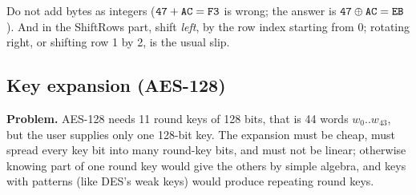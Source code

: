 \begin{trap}[: AddRoundKey]
Do not add bytes as integers ($\texttt{47} + \texttt{AC} = \texttt{F3}$ is wrong; the answer is $\texttt{47} \oplus \texttt{AC} = \texttt{EB}$). And in the ShiftRows part, shift \emph{left}, by the row index starting from 0; rotating right, or shifting row 1 by 2, is the usual slip.
\end{trap}

\subsection{Key expansion (AES-128) \hot}

\textbf{Problem.} AES-128 needs 11 round keys of 128 bits, that is 44 words $w_0..w_{43}$, but the user supplies only one 128-bit key. The expansion must be cheap, must spread every key bit into many round-key bits, and must not be linear; otherwise knowing part of one round key would give the others by simple algebra, and keys with patterns (like DES's weak keys) would produce repeating round keys.

